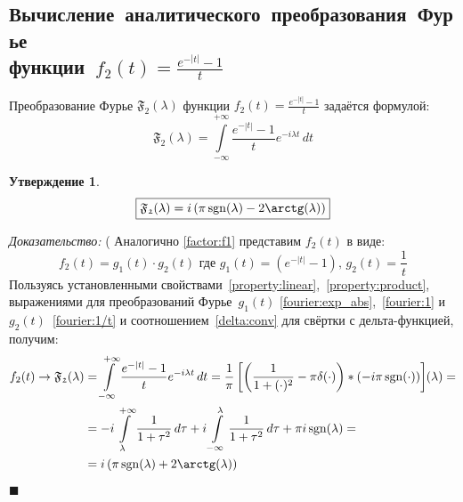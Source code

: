 \documentclass[11pt, oneside, draft]{article}
\numberwithin{equation}{section}
\newtheorem*{statement}{Утверждение}
\renewenvironment{proof}{
\noindent\textit{Доказательство: }} {\qed}
\newcommand \rarrow{\rightarrow}
\newcommand \intinf[1][{\,dt}]{ \int\limits_{-\infty}^{+\infty}{{#1}}}
\renewcommand \qed{$\blacksquare$}
\DeclareMathOperator{\sgn}{sgn}
\begin{document}
    \subsection{Вычисление~аналитического~преобразования~Фурье\\функции~\(f_2(t) = \frac{e^{-|t|} - 1}{t} \)} Преобразование Фурье \( \mathfrak{F_2} (\lambda)\) функции \(f_2(t) = \frac{e^{-|t|} - 1}{t} \) задаётся формулой:
    \[ \mathfrak{F_2} (\lambda) = \intinf[{\dfrac{e^{-|t|} - 1}{t} e^{-i\lambda t}\, dt}] \]
    \begin{statement}
        \begin{equation}\label{fourier_transform:f2} 
            \boxed{ \mathfrak{F_2}(\lambda) = i\left(\pi\sgn(\lambda) - 2\arctg(\lambda)\right) } 
        \end{equation}
    \end{statement}
    \begin{proof}(
        Аналогично \eqref{factor:f1} представим \(f_2(t) \) в виде: 
        \begin{equation}\label{factor:f2} 
            f_2(t) = g_1(t) \cdot g_2(t) \text{ где } g_1(t) = \left(e^{-|t|} - 1\right)\text{, } g_2(t) = \dfrac{1}{t} 
        \end{equation}
        Пользуясь установленными свойствами~\ref{property:linear},~\ref{property:product}, выражениями для преобразований Фурье~\(g_1(t)\) \eqref{fourier:exp_abs},~\eqref{fourier:1} и~\(g_2(t)\)~\eqref{fourier:1/t} и соотношением~\eqref{delta:conv} для свёртки с дельта-функцией, получим:
        \[ 
        \begin{split} 
            f_2(t) \rarrow \mathfrak{F_2} (\lambda) &= \intinf[{ \dfrac{e^{-|t|} - 1}{t} e^{-i\lambda t}\, dt}] = \dfrac{1}{\pi}\left[\left({\dfrac{1}{1 + (\cdot)^2} - \pi\delta(\cdot)}\right) * \left({-i \pi \sgn(\cdot)}\right)\right] \negmedspace({\lambda}) = \\
            &= -i\int\limits_{\lambda}^{+\infty}{\dfrac{1}{1 + \tau^2}\, d\tau} + i\int\limits_{-\infty}^{\lambda}{\dfrac{1}{1 + \tau^2}\, d\tau} + \pi i \sgn(\lambda) = \\
            &= i\left(\pi \sgn(\lambda) + 2\arctg(\lambda)\right) 
        \end{split}
        \]
    \end{proof}
    \pagebreak
    \appendix
\end{document}
